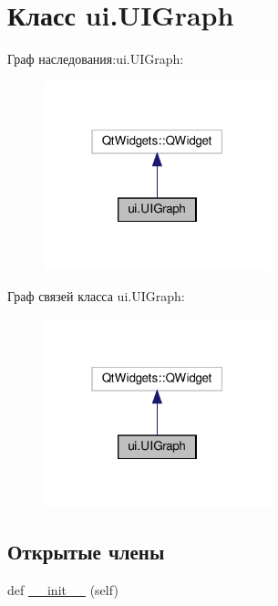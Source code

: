 \hypertarget{classui_1_1_u_i_graph}{}\section{Класс ui.\+U\+I\+Graph}
\label{classui_1_1_u_i_graph}


Граф наследования\+:ui.\+U\+I\+Graph\+:\nopagebreak
\begin{figure}[H]
\begin{center}
\leavevmode
\includegraphics[width=187pt]{classui_1_1_u_i_graph__inherit__graph}
\end{center}
\end{figure}


Граф связей класса ui.\+U\+I\+Graph\+:\nopagebreak
\begin{figure}[H]
\begin{center}
\leavevmode
\includegraphics[width=187pt]{classui_1_1_u_i_graph__coll__graph}
\end{center}
\end{figure}
\subsection*{Открытые члены}
\begin{DoxyCompactItemize}
\item 
def \hyperlink{classui_1_1_u_i_graph_a9be722ae2ab9d25453b743bc1fdad7e3}{\+\_\+\+\_\+init\+\_\+\+\_\+} (self)
\end{DoxyCompactItemize}


